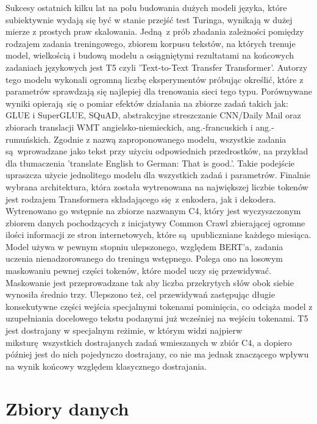 Sukcesy ostatnich kilku lat na polu budowania dużych modeli języka, które subiektywnie wydają się być w stanie przejść test Turinga, wynikają w dużej mierze z prostych praw skalowania. Jedną z prób zbadania zależności pomiędzy rodzajem zadania treningowego, zbiorem korpusu tekstów, na których trenuje model, wielkością i budową modelu a osiągniętymi rezultatami na końcowych zadaniach językowych jest T5 czyli 'Text-to-Text Transfer Transformer'. Autorzy tego modelu wykonali ogromną liczbę eksperymentów próbując określić, które z parametrów sprawdzają się najlepiej dla trenowania sieci tego typu. Porównywane wyniki opierają się o pomiar efektów działania na zbiorze zadań takich jak: GLUE i SuperGLUE, SQuAD, abstrakcyjne streszczanie CNN/Daily Mail oraz zbiorach translacji WMT angielsko-niemieckich, ang.-francuskich i ang.-rumuńskich. \autocite{raffel2020exploring} Zgodnie z nazwą zaproponowanego modelu, wszystkie zadania są wprowadzane jako tekst przy użyciu odpowiednich przedrostków, na przykład dla tłumaczenia 'translate English to German: That is good.'. Takie podejście upraszcza użycie jednolitego modelu dla wszystkich zadań i parametrów. Finalnie wybrana architektura, która została wytrenowana na największej liczbie tokenów jest rodzajem Transformera składającego się z enkodera, jak i dekodera. Wytrenowano go wstępnie na zbiorze nazwanym C4, który jest wyczyszczonym zbiorem danych pochodzących z inicjatywy Common Crawl zbierającej ogromne ilości informacji ze stron internetowych, które są upubliczniane każdego miesiąca. Model używa w pewnym stopniu ulepszonego, względem BERT'a, zadania uczenia nienadzorowanego do treningu wstępnego. Polega ono na losowym maskowaniu pewnej części tokenów, które model uczy się przewidywać. Maskowanie jest przeprowadzane tak aby liczba przekrytych słów obok siebie wynosiła średnio trzy. Ulepszono też, cel przewidywań zastępując długie konsekutywne części wejścia specjalnymi tokenami pominięcia, co odciąża model z uzupełniania docelowego tekstu podanymi już wcześniej na wejściu tokenami. T5 jest dostrajany w specjalnym reżimie, w którym widzi najpierw miksturę wszystkich dostrajanych zadań wmieszanych w zbiór C4, a dopiero później jest do nich pojedynczo dostrajany, co nie ma jednak znaczącego wpływu na wynik końcowy względem klasycznego dostrajania. \autocite{raffel2020exploring}

\section{Zbiory danych}

